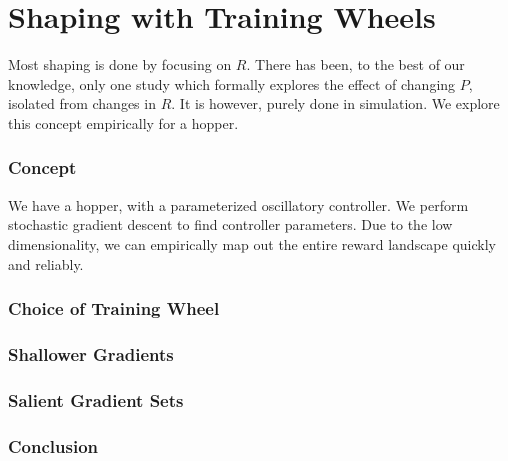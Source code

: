 
\chapter{Shaping with Training Wheels}

Most shaping is done by focusing on $R$. There has been, to the best of our knowledge, only one study which formally explores the effect of changing $P$, isolated from changes in $R$. It is however, purely done in simulation. We explore this concept empirically for a hopper.

\subsection{Concept}
We have a hopper, with a parameterized oscillatory controller. We perform stochastic gradient descent to find controller parameters. Due to the low dimensionality, we can empirically map out the entire reward landscape quickly and reliably.  
\subsection{Choice of Training Wheel}
\subsection{Shallower Gradients}
\subsection{Salient Gradient Sets}

\subsection{Conclusion}